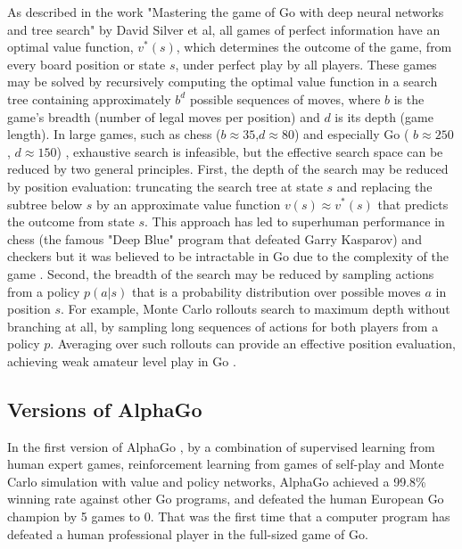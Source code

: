 \documentclass{article}
\begin{document}
As described in the work "Mastering the game of Go with deep neural networks and tree search"\cite{Silver_2016} by David Silver et al, all games of perfect information have an optimal value function, $v^*(s)$, which determines the outcome of the game, from every board position
or state $s$, under perfect play by all players. These games may be solved by recursively computing the optimal value function in a search tree
containing approximately $b^d$ possible sequences of moves, where $b$ is
the game's breadth (number of legal moves per position) and $d$ is its depth (game length). In large games, such as chess ($b \approx 35$,$ d \approx 80$) \cite{Allis1994SearchingFS} and especially Go ( $b \approx 250$, $d \approx 150$) \cite{Allis1994SearchingFS}, exhaustive search is infeasible, but the effective search space can be reduced by two general principles. First, the depth of the search may be reduced by position evaluation: truncating the search tree at state $s$ and replacing the subtree below $s$ by an approximate value function $v(s) \approx v^*(s)$ that predicts the outcome from state $s$. This approach has led to superhuman performance in chess \cite{CAMPBELL200257} (the famous "Deep Blue" program that defeated Garry Kasparov\cite{CAMPBELL200257}) and checkers \cite{10.1007/3-540-48957-6_8} but it was believed to be intractable in Go due to the complexity of the game \cite{MULLER2002145}. Second, the breadth of the search
may be reduced by sampling actions from a policy $p(a|s)$ that is a probability distribution over possible moves $a$ in position $s$. For example,
Monte Carlo rollouts search to maximum depth without branching at all, by sampling long sequences of actions for both players from a
policy $p$. Averaging over such rollouts can provide an effective position evaluation, achieving weak amateur level play in Go \cite{Bouzy2004}.

\subsection{Versions  of AlphaGo}
In the first version of AlphaGo \cite{Silver_2016}, by a combination of supervised learning from human expert games, reinforcement learning from games of self-play and Monte Carlo simulation with value and policy networks, AlphaGo achieved a 99.8\% winning rate against other Go programs, and defeated the human European Go champion by 5 games to 0. That was the first time that a computer program has defeated a human professional player in the full-sized game of Go.
\end{document}

